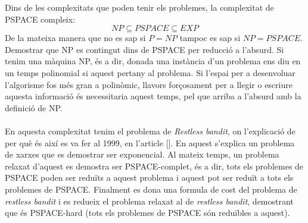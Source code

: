 
	Dins de les complexitats que poden tenir els problemes, la complexitat de PSPACE compleix:
	\[
	{NP} \subseteq PSPACE \subseteq {EXP} %
	\]
	De la mateixa manera que no es sap si $P = NP$ tampoc es sap si $NP = PSPACE$. Demostrar que NP es contingut dins de
	PSPACE per reducció a l'absurd. Si tenim una màquina NP, és a dir, donada una instància d'un problema ens diu en un temps 
	polinomial si aquest pertany al problema. Si l'espai per a desenvoluar l'algorisme fos més gran a polinòmic, llavors forçosament
	per a llegir o escriure aquesta informació és necessitaria aquest temps, pel que arriba a l'absurd amb la definició de NP. %
	\\
	\\
	En aquesta complexitat tenim el problema de \textit{Restless bandit}, on l'explicació de per què és així es va fer al 1999, en 
	l'article [].%
	En aquest s'explica un problema de xarxes que es demostrar ser exponencial. Al mateix temps, un problema relaxat d'aquest
	es demostra ser PSPACE-complet, és a dir, tots els problemes de PSPACE poden ser reduïts a aquest problema i aquest pot
	ser reduït a tots els problemes de PSPACE. Finalment es dona una formula de cost del problema de \textit{restless bandit} i
	es redueix el problema relaxat al de \textit{restless bandit}, demostrant que és PSPACE-hard (tots els problemes de PSPACE són
	reduïbles a aquest). %
